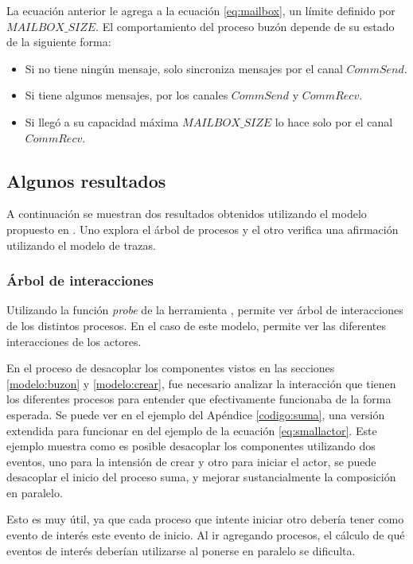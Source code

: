 La ecuación anterior le agrega a la ecuación \eqref{eq:mailbox}, un límite definido por $MAILBOX\_SIZE$. El comportamiento del proceso buzón depende de su estado de la siguiente forma:

\begin{itemize}
\item Si no tiene ningún mensaje, solo sincroniza mensajes por el canal $CommSend$.
\item Si tiene algunos mensajes, por los canales $CommSend$ y $CommRecv$.
\item Si llegó a su capacidad máxima $MAILBOX\_SIZE$ lo hace solo por el canal $CommRecv$.
\end{itemize}

\subsection{Algunos resultados}

A continuación se muestran dos resultados obtenidos utilizando el modelo propuesto en \CSPm. Uno explora el árbol de procesos y el otro verifica una afirmación utilizando el modelo de trazas.

\subsubsection*{Árbol de interacciones}

Utilizando la función \textit{probe} de la herramienta \FDR, permite ver árbol de interacciones de los distintos procesos. En el caso de este modelo, permite ver las diferentes interacciones de los actores.

En el proceso de desacoplar los componentes vistos en las secciones \ref{modelo:buzon} y \ref{modelo:crear}, fue necesario analizar la interacción que tienen los diferentes procesos para entender que efectivamente funcionaba de la forma esperada. Se puede ver en el ejemplo del Apéndice \ref{codigo:suma}, una versión extendida para funcionar en \FDR del ejemplo de la ecuación \ref{eq:smallactor}. Este ejemplo muestra como es posible desacoplar los componentes utilizando dos eventos, uno para la intensión de crear y otro para iniciar el actor, se puede desacoplar el inicio del proceso suma, y mejorar sustancialmente la composición en paralelo. 

Esto es muy útil, ya que cada proceso que intente iniciar otro debería tener como evento de interés este evento de inicio. Al ir agregando procesos, el cálculo de qué eventos de interés deberían utilizarse al ponerse en paralelo se dificulta. 

